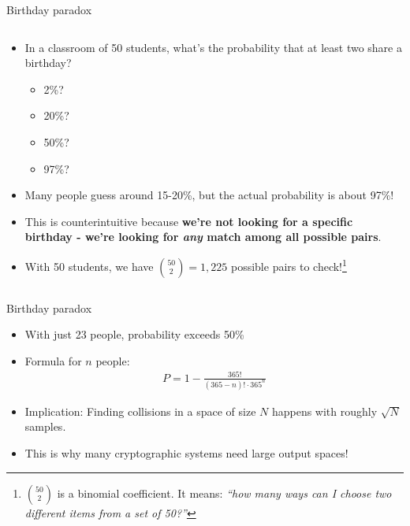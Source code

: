 \documentclass[aspectratio=169, lualatex, handout]{beamer}
\begin{document}
\begin{frame}{Birthday paradox}
	\begin{columns}[c]
		\begin{column}{1\textwidth}
			\begin{itemize}[<+->]
				\item In a classroom of 50 students, what's the probability that at least two share a birthday?
				      \begin{itemize}
					      \item 2\%?
					      \item 20\%?
					      \item 50\%?
					      \item 97\%?
				      \end{itemize}
				\item Many people guess around 15-20\%, but the actual probability is about 97\%!
				\item This is counterintuitive because \textbf{we're not looking for a specific birthday - we're looking for \textit{any} match among all possible pairs}.
				\item With 50 students, we have $\binom{50}{2} = 1,225$ possible pairs to check!\footnote{$\binom{50}{2}$ is a binomial coefficient. It means: \textit{``how many ways can I choose two different items from a set of 50?''}}
			\end{itemize}
		\end{column}
	\end{columns}
\end{frame}

\begin{frame}{Birthday paradox}
	\begin{itemize}
		\item With just 23 people, probability exceeds 50\%
		\item Formula for $n$ people:
		      \begin{align*}
			      P = 1 - \frac{365!}{(365-n)! \cdot 365^n}
		      \end{align*}
		\item Implication: Finding collisions in a space of size $N$ happens with roughly $\sqrt{N}$ samples.
		\item This is why many cryptographic systems need large output spaces!
	\end{itemize}
\end{frame}
\end{document}
